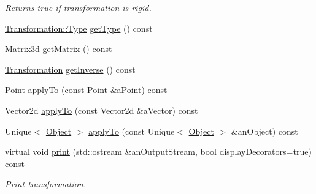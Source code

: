 \begin{DoxyCompactItemize}
\begin{DoxyCompactList}\small\item\em Returns true if transformation is rigid. \end{DoxyCompactList}\item 
\hyperlink{classostk_1_1math_1_1geom_1_1d2_1_1_transformation_ad98045429a325b64040ef419cb68bea9}{Transformation\+::\+Type} \hyperlink{classostk_1_1math_1_1geom_1_1d2_1_1_transformation_a4f36c824e1615a739281bb9e8ef0fbf3}{get\+Type} () const
\item 
Matrix3d \hyperlink{classostk_1_1math_1_1geom_1_1d2_1_1_transformation_a1dc68ec8bc18c8866b20321f9f1cd838}{get\+Matrix} () const
\item 
\hyperlink{classostk_1_1math_1_1geom_1_1d2_1_1_transformation}{Transformation} \hyperlink{classostk_1_1math_1_1geom_1_1d2_1_1_transformation_ae8943bea9acbc1157e33e779d48d6aaa}{get\+Inverse} () const
\item 
\hyperlink{classostk_1_1math_1_1geom_1_1d2_1_1objects_1_1_point}{Point} \hyperlink{classostk_1_1math_1_1geom_1_1d2_1_1_transformation_a96728b260bab0f10c15dcaffff987834}{apply\+To} (const \hyperlink{classostk_1_1math_1_1geom_1_1d2_1_1objects_1_1_point}{Point} \&a\+Point) const
\item 
Vector2d \hyperlink{classostk_1_1math_1_1geom_1_1d2_1_1_transformation_a68dbbf65bf23a8554d704a45210a5dac}{apply\+To} (const Vector2d \&a\+Vector) const
\item 
Unique$<$ \hyperlink{classostk_1_1math_1_1geom_1_1d2_1_1_object}{Object} $>$ \hyperlink{classostk_1_1math_1_1geom_1_1d2_1_1_transformation_ae3914777ee603c0be8f47eaeadf8a749}{apply\+To} (const Unique$<$ \hyperlink{classostk_1_1math_1_1geom_1_1d2_1_1_object}{Object} $>$ \&an\+Object) const
\item 
virtual void \hyperlink{classostk_1_1math_1_1geom_1_1d2_1_1_transformation_a4a0334d0d44f09e2022595ec1156bb1a}{print} (std\+::ostream \&an\+Output\+Stream, bool display\+Decorators=true) const
\begin{DoxyCompactList}\small\item\em Print transformation. \end{DoxyCompactList}\end{DoxyCompactItemize}
